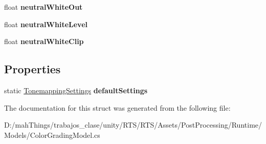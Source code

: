 \begin{DoxyCompactItemize}
float {\bfseries neutral\+White\+Out}
\item 
\mbox{\label{struct_unity_engine_1_1_post_processing_1_1_color_grading_model_1_1_tonemapping_settings_a4f2e937233ddb0d540977b2ea1748137}} 
float {\bfseries neutral\+White\+Level}
\item 
\mbox{\label{struct_unity_engine_1_1_post_processing_1_1_color_grading_model_1_1_tonemapping_settings_a2433f12d9af67406a0117ea05e67f117}} 
float {\bfseries neutral\+White\+Clip}
\end{DoxyCompactItemize}
\subsection*{Properties}
\begin{DoxyCompactItemize}
\item 
\mbox{\label{struct_unity_engine_1_1_post_processing_1_1_color_grading_model_1_1_tonemapping_settings_afaaeaac01b5da1e740cf66a4e56abe7b}} 
static \mbox{\hyperlink{struct_unity_engine_1_1_post_processing_1_1_color_grading_model_1_1_tonemapping_settings}{Tonemapping\+Settings}} {\bfseries default\+Settings}
\end{DoxyCompactItemize}


The documentation for this struct was generated from the following file\+:\begin{DoxyCompactItemize}
\item 
D\+:/mah\+Things/trabajos\+\_\+clase/unity/\+R\+T\+S/\+R\+T\+S/\+Assets/\+Post\+Processing/\+Runtime/\+Models/Color\+Grading\+Model.\+cs\end{DoxyCompactItemize}
